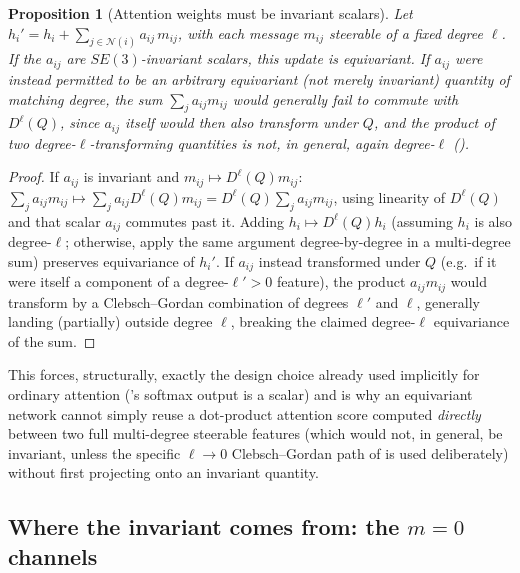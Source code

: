 \documentclass[11pt,a4paper]{report}
\newtheorem{proposition}[proposition]{Proposition}
\theoremstyle{definition}
\theoremstyle{remark}
\begin{document}
\begin{proposition}[Attention weights must be invariant scalars]
\label{prop:attention-weights-scalar}
Let $h_i' = h_i + \sum_{j\in\mathcal N(i)}a_{ij}\,m_{ij}$, with each message
$m_{ij}$ steerable of a fixed degree $\ell$. If the $a_{ij}$ are
$SE(3)$-invariant scalars, this update is equivariant. If $a_{ij}$ were
instead permitted to be an arbitrary equivariant (not merely invariant)
quantity of matching degree, the sum $\sum_ja_{ij}m_{ij}$ would generally
fail to commute with $D^\ell(Q)$, since $a_{ij}$ itself would then also
transform under $Q$, and the product of two degree-$\ell$-transforming
quantities is not, in general, again degree-$\ell$ ().
\end{proposition}

\begin{proof}
If $a_{ij}$ is invariant and $m_{ij}\mapsto D^\ell(Q)m_{ij}$:
$\sum_ja_{ij}m_{ij}\mapsto\sum_ja_{ij}D^\ell(Q)m_{ij}=D^\ell(Q)\sum_ja_{ij}m_{ij}$,
using linearity of $D^\ell(Q)$ and that scalar $a_{ij}$ commutes past it.
Adding $h_i\mapsto D^\ell(Q)h_i$ (assuming $h_i$ is also degree-$\ell$;
otherwise, apply the same argument degree-by-degree in a multi-degree sum)
preserves equivariance of $h_i'$. If $a_{ij}$ instead transformed under $Q$
(e.g.\ if it were itself a component of a degree-$\ell'>0$ feature), the
product $a_{ij}m_{ij}$ would transform by a Clebsch--Gordan combination of
degrees $\ell'$ and $\ell$, generally landing (partially) outside degree
$\ell$, breaking the claimed degree-$\ell$ equivariance of the sum.
\end{proof}

This forces, structurally, exactly the design choice 
already used implicitly for ordinary attention ('s
softmax output is a scalar) and is why an equivariant network cannot simply
reuse a dot-product attention score computed \emph{directly} between two
full multi-degree steerable features (which would not, in general, be
invariant, unless the specific $\ell\to0$ Clebsch--Gordan path of
 is used deliberately) without first projecting
onto an invariant quantity.

\subsection{Where the invariant comes from: the \texorpdfstring{$m=0$}{m=0} channels}
\label{sec:m0-invariance}
\end{document}
